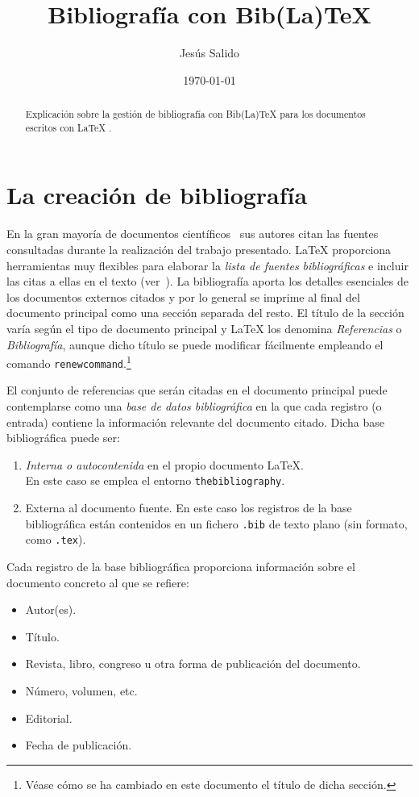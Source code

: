 \documentclass[11pt,a4paper]{article}
\author{Jesús Salido}
\title{Bibliografía con Bib(La)\TeX{}}
\date{\today}
\begin{document}
\maketitle


\begin{abstract}
Explicación sobre la gestión de bibliografía con Bib(La)\TeX{} para los documentos escritos con \LaTeX{} \cite{wikibookLaTex10}.
\end{abstract}

\tableofcontents

\section{La creación de bibliografía}
En la gran mayoría de documentos científicos~\cite{salido15} sus autores citan las fuentes consultadas durante la realización del trabajo presentado. \LaTeX{} proporciona herramientas muy flexibles para elaborar la \emph{lista de fuentes bibliográficas} e incluir las citas a ellas en el texto (ver~\cite{cascales00,cascales03,goos04,kopka04,lamport94}). La bibliografía aporta los detalles esenciales de los documentos externos citados y por lo general se imprime al final del documento principal como una sección separada del resto. El título de la sección varía según el tipo de documento principal y \LaTeX{} los denomina \emph{Referencias} o \emph{Bibliografía}, aunque dicho título se puede modificar fácilmente empleando el comando \texttt{renewcommand}.\footnote{Véase cómo se ha cambiado en este documento el título de dicha sección.}

El conjunto de referencias que serán citadas en el documento principal puede contemplarse como una \emph{base de datos bibliográfica} en la que cada registro (o entrada) contiene la información relevante del documento citado. Dicha base bibliográfica puede ser:
\begin{enumerate}
	\item \emph{Interna o autocontenida} en el propio documento \LaTeX{}.\\
	 En este caso se emplea el entorno \texttt{thebibliography}.
	
	\item Externa al documento fuente. En este caso los registros de la base bibliográfica están contenidos en un fichero \texttt{.bib} de texto plano (sin formato, como \texttt{.tex}).
\end{enumerate}



Cada registro de la base bibliográfica proporciona información sobre el documento concreto al que se refiere:
\begin{itemize}
	\item Autor(es).
	\item Título.
	\item Revista, libro, congreso u otra forma de publicación del documento.
	\item Número, volumen, etc.
	\item Editorial.
	\item Fecha de publicación.
\end{itemize}
\end{document}
